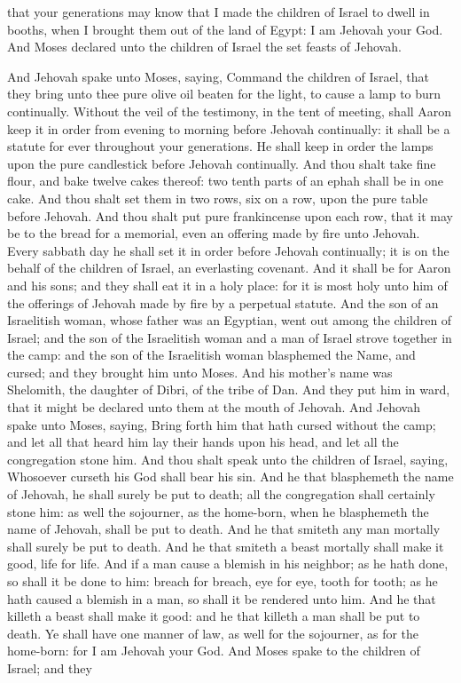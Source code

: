 that your generations may know that I made the children of Israel to dwell in booths, when I brought them out of the land of Egypt: I am Jehovah your God. And Moses declared unto the children of Israel the set feasts of Jehovah. 

And Jehovah spake unto Moses, saying, Command the children of Israel, that they bring unto thee pure olive oil beaten for the light, to cause a lamp to burn continually. Without the veil of the testimony, in the tent of meeting, shall Aaron keep it in order from evening to morning before Jehovah continually: it shall be a statute for ever throughout your generations. He shall keep in order the lamps upon the pure candlestick before Jehovah continually.  And thou shalt take fine flour, and bake twelve cakes thereof: two tenth parts of an ephah shall be in one cake. And thou shalt set them in two rows, six on a row, upon the pure table before Jehovah. And thou shalt put pure frankincense upon each row, that it may be to the bread for a memorial, even an offering made by fire unto Jehovah. Every sabbath day he shall set it in order before Jehovah continually; it is on the behalf of the children of Israel, an everlasting covenant. And it shall be for Aaron and his sons; and they shall eat it in a holy place: for it is most holy unto him of the offerings of Jehovah made by fire by a perpetual statute.  And the son of an Israelitish woman, whose father was an Egyptian, went out among the children of Israel; and the son of the Israelitish woman and a man of Israel strove together in the camp: and the son of the Israelitish woman blasphemed the Name, and cursed; and they brought him unto Moses. And his mother’s name was Shelomith, the daughter of Dibri, of the tribe of Dan. And they put him in ward, that it might be declared unto them at the mouth of Jehovah.  And Jehovah spake unto Moses, saying, Bring forth him that hath cursed without the camp; and let all that heard him lay their hands upon his head, and let all the congregation stone him. And thou shalt speak unto the children of Israel, saying, Whosoever curseth his God shall bear his sin. And he that blasphemeth the name of Jehovah, he shall surely be put to death; all the congregation shall certainly stone him: as well the sojourner, as the home-born, when he blasphemeth the name of Jehovah, shall be put to death. And he that smiteth any man mortally shall surely be put to death. And he that smiteth a beast mortally shall make it good, life for life. And if a man cause a blemish in his neighbor; as he hath done, so shall it be done to him: breach for breach, eye for eye, tooth for tooth; as he hath caused a blemish in a man, so shall it be rendered unto him. And he that killeth a beast shall make it good: and he that killeth a man shall be put to death. Ye shall have one manner of law, as well for the sojourner, as for the home-born: for I am Jehovah your God. And Moses spake to the children of Israel; and they 